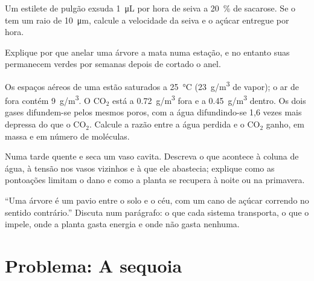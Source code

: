 \begin{exercise}[$\star\star$]\label{exo:b1:plant-transport:8}
Um estilete de pulgão exsuda \qty{1}{\micro L} por hora de seiva a
\qty{20}{\%} de sacarose. Se o  tem um raio de
\qty{10}{\micro m}, calcule a velocidade da seiva e o açúcar entregue
por hora.
\end{exercise}

\begin{exercise}[$\star\star$]\label{exo:b1:plant-transport:9}
Explique por que anelar uma árvore a mata numa estação, e no entanto
suas  permanecem verdes por semanas depois de cortado o anel.
\end{exercise}

\begin{exercise}[$\star\star\star$]\label{exo:b1:plant-transport:10}
Os espaços aéreos de uma  estão saturados a \qty{25}{\celsius}
(\qty{23}{g/m^3} de vapor); o ar de fora contém \qty{9}{g/m^3}. O
$\mathrm{CO_2}$ está a \qty{0.72}{g/m^3} fora e a \qty{0.45}{g/m^3}
dentro. Os dois gases difundem-se pelos mesmos poros, com a água
difundindo-se 1,6 vezes mais depressa do que o $\mathrm{CO_2}$.
Calcule a razão entre a água perdida e o $\mathrm{CO_2}$ ganho, em
massa e em número de moléculas.
\end{exercise}

\begin{exercise}[$\star\star\star$]\label{exo:b1:plant-transport:11}
Numa tarde quente e seca um vaso cavita. Descreva o que acontece à
coluna de água, à tensão nos vasos vizinhos e à  que ele
abastecia; explique como as pontoações limitam o dano e como a planta
se recupera à noite ou na primavera.
\end{exercise}

\begin{exercise}[$\star\star\star$]\label{exo:b1:plant-transport:12}
``Uma árvore é um pavio entre o solo e o céu, com um cano de açúcar
correndo no sentido contrário.'' Discuta num parágrafo: o que cada
sistema transporta, o que o impele, onde a planta gasta energia e onde
não gasta nenhuma.
\end{exercise}

\section{Problema: A sequoia}


